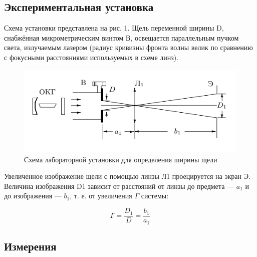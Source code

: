 \documentclass[a4paper, 12pt]{article}
\begin{document}
\subsection*{Экспериментальная установка}

Схема установки представлена на рис. 1. Щель переменной ширины D, снабжённая микрометрическим винтом В, освещается параллельным пучком света, излучаемым лазером (радиус кривизны фронта волны велик по сравнению с фокусными расстояниями используемых в схеме линз).

\begin{figure}[h]
    \centering
    \includegraphics[width=15cm]{scheme_I.png}
    \caption{Схема лабораторной установки для определения ширины щели}
    \label{fig:scheme_I}
\end{figure}

Увеличенное изображение щели с помощью линзы Л1 проецируется на экран Э. Величина изображения D1 зависит от расстояний от линзы до предмета — $a_1$ и до изображения — $b_1$, т. е. от увеличения $\Gamma$ системы:

$$\Gamma=\frac{D_{1}}{D}=\frac{b_{1}}{a_{1}}$$

\newpage

\subsection*{Измерения}
\end{document}
